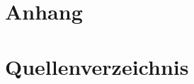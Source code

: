 \documentclass[12pt, titlepage]{article}
\begin{document}


\doublespacing




















\newpage
\section*{Anhang}


\newpage
\section*{Quellenverzeichnis}
\printbibliography

\newpage
\end{document}
